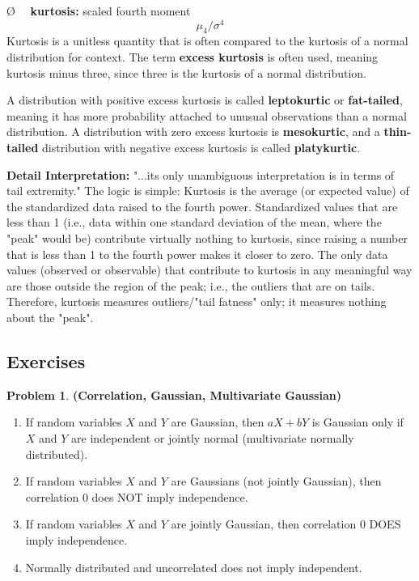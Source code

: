 \documentclass[13pt]{article}
\theoremstyle{definition}
\newtheorem{problem}[theorem]{Problem}
\theoremstyle{remark}
\newenvironment{point}
  {\O~~}
  {}
\begin{document}
  \begin{point}
    \textbf{kurtosis:} scaled fourth moment \[\mu_4/\sigma^{4}\]
    Kurtosis is a unitless quantity that is often compared to the kurtosis of a normal distribution for context. The term \textbf{excess kurtosis} is often used, meaning kurtosis minus three, since three is the kurtosis of a normal distribution. 
    
    A distribution with positive excess kurtosis is called \textbf{leptokurtic} or \textbf{fat-tailed}, meaning it has more probability attached to unusual observations than a normal distribution. A distribution with zero excess kurtosis is \textbf{mesokurtic}, and a \textbf{thin-tailed} distribution with negative excess kurtosis is called \textbf{platykurtic}.
    
    \textbf{Detail Interpretation:} "...its only unambiguous interpretation is in terms of tail extremity." The logic is simple: Kurtosis is the average (or expected value) of the standardized data raised to the fourth power. Standardized values that are less than 1 (i.e., data within one standard deviation of the mean, where the "peak" would be) contribute virtually nothing to kurtosis, since raising a number that is less than 1 to the fourth power makes it closer to zero. The only data values (observed or observable) that contribute to kurtosis in any meaningful way are those outside the region of the peak; i.e., the outliers that are on tails. Therefore, kurtosis measures outliers/"tail fatness" only; it measures nothing about the "peak". 
\end{point}

\subsection{Exercises}
\begin{problem}\textbf{(Correlation, Gaussian, Multivariate Gaussian)}
    \begin{enumerate}[label=(\alph*)]
        \item If random variables $X$ and $Y$ are Gaussian, then $aX+bY$ is Gaussian only if $X$ and $Y$ are independent or jointly normal (multivariate normally distributed).
        \item If random variables $X$ and $Y$ are Gaussians (not jointly Gaussian), then correlation $0$ does NOT imply independence.
        \item If random variables $X$ and $Y$ are jointly Gaussian, then correlation $0$ DOES imply independence.
        \item Normally distributed and uncorrelated does not imply independent.
    \end{enumerate}    
\end{problem}
\end{document}
